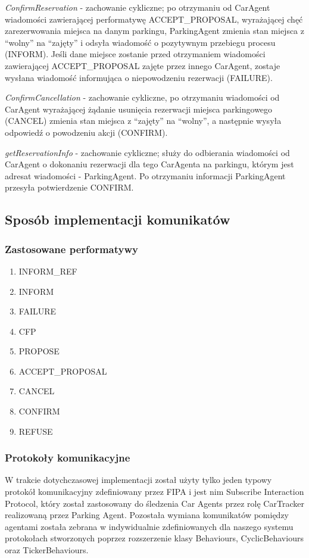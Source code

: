 \textit{ConfirmReservation} - zachowanie cykliczne; po otrzymaniu od CarAgent wiadomości zawierającej performatywę ACCEPT\_PROPOSAL, wyrażającej chęć zarezerwowania miejsca na danym parkingu, ParkingAgent zmienia stan miejsca z “wolny” na “zajęty” i odsyła wiadomość o pozytywnym przebiegu procesu (INFORM). Jeśli dane miejsce zostanie przed otrzymaniem wiadomości zawierającej ACCEPT\_PROPOSAL zajęte przez innego CarAgent, zostaje wysłana wiadomość informująca o niepowodzeniu rezerwacji (FAILURE).

\textit{ConfirmCancellation} - zachowanie cykliczne, po otrzymaniu wiadomości od CarAgent wyrażającej żądanie usunięcia rezerwacji miejsca parkingowego (CANCEL) zmienia stan miejsca z “zajęty” na “wolny”, a następnie wysyła odpowiedź o powodzeniu akcji (CONFIRM).

\textit{getReservationInfo} - zachowanie cykliczne; służy do odbierania wiadomości od CarAgent o dokonaniu rezerwacji dla tego CarAgenta na parkingu, którym jest adresat wiadomości - ParkingAgent. Po otrzymaniu informacji ParkingAgent przesyła potwierdzenie CONFIRM.


\subsection{Sposób implementacji komunikatów}

\subsubsection{Zastosowane performatywy}
\begin{enumerate}
    \item INFORM\_REF
    \item INFORM
    \item FAILURE
    \item CFP
    \item PROPOSE
    \item ACCEPT\_PROPOSAL
    \item CANCEL
    \item CONFIRM
    \item REFUSE
\end{enumerate}

\subsubsection{Protokoły komunikacyjne}

W trakcie dotychczasowej implementacji został użyty tylko jeden typowy protokół komunikacyjny zdefiniowany przez FIPA i jest nim Subscribe Interaction Protocol, który został zastosowany do śledzenia Car Agents przez rolę CarTracker realizowaną przez Parking Agent. Pozostała wymiana komunikatów pomiędzy agentami została zebrana w indywidualnie zdefiniowanych dla naszego systemu protokołach stworzonych poprzez rozszerzenie klasy Behaviours, CyclicBehaviours oraz TickerBehaviours.

